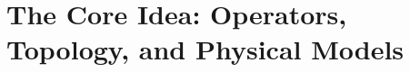 \documentclass[12pt, openany]{book}
\begin{document}
\tableofcontents



 \part{The Core Idea: Operators, Topology, and Physical Models}



\end{document}
